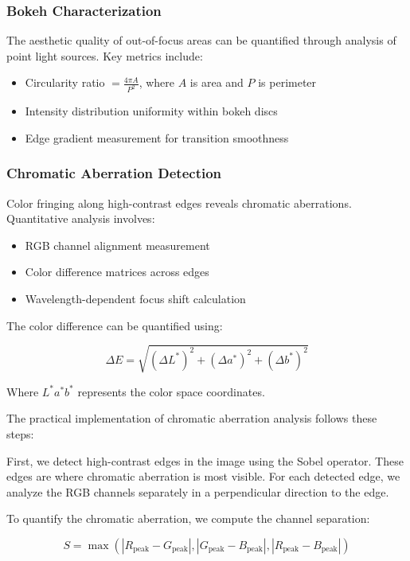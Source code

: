 \subsubsection{Bokeh Characterization}
The aesthetic quality of out-of-focus areas can be quantified through analysis of point light sources. Key metrics include:

\begin{itemize}
    \item Circularity ratio \( = \frac{4\pi A}{P^2} \), where \( A \) is area and \( P \) is perimeter
    \item Intensity distribution uniformity within bokeh discs
    \item Edge gradient measurement for transition smoothness
\end{itemize}

\subsubsection{Chromatic Aberration Detection}
Color fringing along high-contrast edges reveals chromatic aberrations. Quantitative analysis involves:

\begin{itemize}
    \item RGB channel alignment measurement
    \item Color difference matrices across edges
    \item Wavelength-dependent focus shift calculation
\end{itemize}

The color difference can be quantified using:

\begin{equation}
\Delta E = \sqrt{(\Delta L^*)^2 + (\Delta a^*)^2 + (\Delta b^*)^2}
\end{equation}

Where \( L^*a^*b^* \) represents the color space coordinates.

The practical implementation of chromatic aberration analysis follows these steps:

First, we detect high-contrast edges in the image using the Sobel operator. These edges are where chromatic aberration is most visible. For each detected edge, we analyze the RGB channels separately in a perpendicular direction to the edge.

To quantify the chromatic aberration, we compute the channel separation:

\begin{equation}
S = \max\left(|R_{\text{peak}} - G_{\text{peak}}|, |G_{\text{peak}} - B_{\text{peak}}|, |R_{\text{peak}} - B_{\text{peak}}|\right)
\end{equation}

